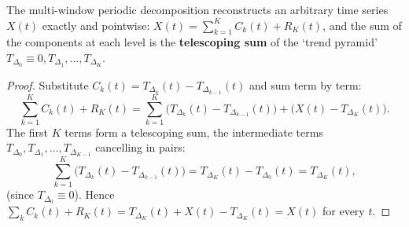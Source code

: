 \begin{proposition}\label{ch31_multiscale_reconstruction}
The multi-window periodic decomposition reconstructs an arbitrary time series $X(t)$ exactly and pointwise: $X(t) = \sum_{k=1}^{K} C_k(t) + R_K(t)$, and the sum of the components at each level is the \textbf{telescoping sum} of the `trend pyramid' $T_{\Delta_0} \equiv 0, T_{\Delta_1}, \dots, T_{\Delta_K}$.
\end{proposition}

\begin{proof}
Substitute $C_k(t) = T_{\Delta_k}(t) - T_{\Delta_{k-1}}(t)$ and sum term by term:
\[
\sum_{k=1}^{K} C_k(t) + R_K(t)
= \sum_{k=1}^{K} \big( T_{\Delta_k}(t) - T_{\Delta_{k-1}}(t) \big) + \big( X(t) - T_{\Delta_K}(t) \big).
\]
The first $K$ terms form a telescoping sum, the intermediate terms $T_{\Delta_0}, T_{\Delta_1}, \dots, T_{\Delta_{K-1}}$ cancelling in pairs:
\[
\sum_{k=1}^{K} \big( T_{\Delta_k}(t) - T_{\Delta_{k-1}}(t) \big) = T_{\Delta_K}(t) - T_{\Delta_0}(t) = T_{\Delta_K}(t),
\]
(since $T_{\Delta_0} \equiv 0$). Hence $\sum_k C_k(t) + R_K(t) = T_{\Delta_K}(t) + X(t) - T_{\Delta_K}(t) = X(t)$ for every $t$.
\end{proof}

